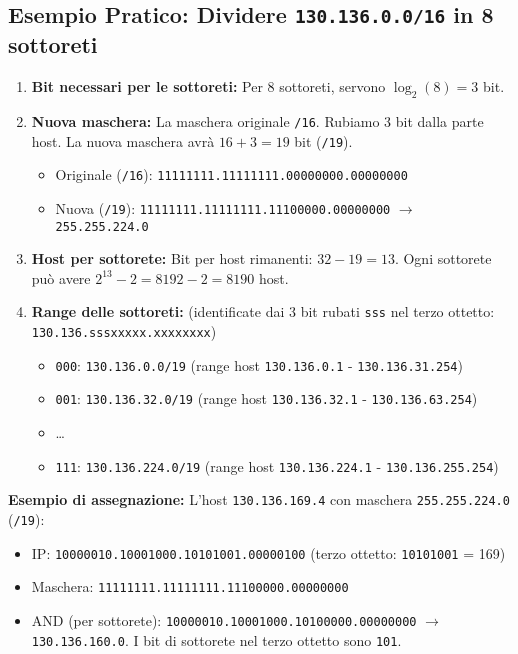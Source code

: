 \documentclass{article}
\begin{document}
\subsection{Esempio Pratico: Dividere \texttt{130.136.0.0/16} in 8 sottoreti}
\begin{enumerate}
    \item \textbf{Bit necessari per le sottoreti:} Per 8 sottoreti, servono $\log_2(8) = 3$ bit.
    \item \textbf{Nuova maschera:} La maschera originale \texttt{/16}. Rubiamo 3 bit dalla parte host. La nuova maschera avrà $16 + 3 = 19$ bit (\texttt{/19}).
    \begin{itemize}
        \item Originale (\texttt{/16}): \texttt{11111111.11111111.00000000.00000000}
        \item Nuova (\texttt{/19}): \texttt{11111111.11111111.11100000.00000000} $\rightarrow$ \texttt{255.255.224.0}
    \end{itemize}
    \item \textbf{Host per sottorete:} Bit per host rimanenti: $32 - 19 = 13$.
    Ogni sottorete può avere $2^{13} - 2 = 8192 - 2 = 8190$ host.
    \item \textbf{Range delle sottoreti:} (identificate dai 3 bit rubati \texttt{sss} nel terzo ottetto: \texttt{130.136.sssxxxxx.xxxxxxxx})
    \begin{itemize}
        \item \texttt{000}: \texttt{130.136.0.0/19} (range host \texttt{130.136.0.1} - \texttt{130.136.31.254})
        \item \texttt{001}: \texttt{130.136.32.0/19} (range host \texttt{130.136.32.1} - \texttt{130.136.63.254})
        \item \dots
        \item \texttt{111}: \texttt{130.136.224.0/19} (range host \texttt{130.136.224.1} - \texttt{130.136.255.254})
    \end{itemize}
\end{enumerate}
\textbf{Esempio di assegnazione:} L'host \texttt{130.136.169.4} con maschera \texttt{255.255.224.0} (\texttt{/19}):
\begin{itemize}
    \item IP: \texttt{10000010.10001000.10101001.00000100} (terzo ottetto: \texttt{10101001} = 169)
    \item Maschera: \texttt{11111111.11111111.11100000.00000000}
    \item AND (per sottorete): \texttt{10000010.10001000.10100000.00000000} $\rightarrow$ \texttt{130.136.160.0}.
    I bit di sottorete nel terzo ottetto sono \texttt{101}.
\end{itemize}
\end{document}
